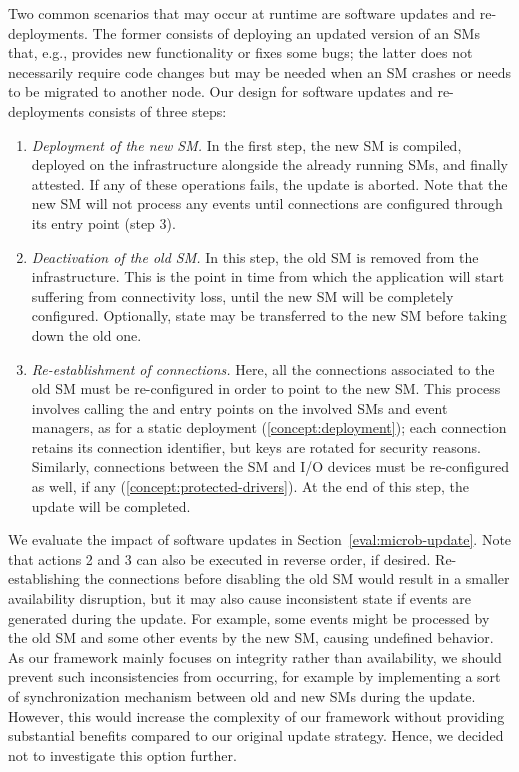 Two common scenarios that may occur at runtime are software updates and
re-deployments. The former consists of deploying an updated version of an
\acp{SM} that, e.g., provides new functionality or fixes some bugs; the latter
does not necessarily require code changes but may be needed when an \ac{SM}
crashes or needs to be migrated to another node. 
%
Our design for software updates and re-deployments consists of three steps:

\begin{enumerate}
  \item \emph{Deployment of the new \ac{SM}.} In the first step, the new \ac{SM}
  is compiled, deployed on the infrastructure alongside the already running
  \acp{SM}, and finally attested. If any of these operations fails, the update
  is aborted. Note that the new \ac{SM} will not process any events until
  connections are configured through its \setkey{} entry point (step 3).
  \item \emph{Deactivation of the old \ac{SM}.} In this step, the old \ac{SM} is
  removed from the infrastructure. This is the point in time from which the
  application will start suffering from connectivity loss, until the new \ac{SM}
  will be completely configured. Optionally, state may be transferred to the new
  \ac{SM} before taking down the old one.
  \item \emph{Re-establishment of connections.} Here, all the connections
  associated to the old \ac{SM} must be re-configured in order to point to the
  new \ac{SM}. This process involves calling the \setkey{} and \addconnection{}
  entry points on the involved \acp{SM} and event managers, as for a static
  deployment (\cref{concept:deployment}); each connection retains its connection
  identifier, but keys are rotated for security reasons. Similarly, connections
  between the \ac{SM} and I/O devices must be re-configured as well, if any
  (\cref{concept:protected-drivers}). At the end of this step, the update will
  be completed.
\end{enumerate}

We evaluate the impact of software updates in Section~\ref{eval:microb-update}.
Note that actions 2 and 3 can also be executed in reverse order, if desired.
Re-establishing the connections before disabling the old \ac{SM} would result in
a smaller availability disruption, but it may also cause inconsistent state if
events are generated during the update. For example, some events might be
processed by the old \ac{SM} and some other events by the new \ac{SM}, causing
undefined behavior. As our framework mainly focuses on integrity rather than
availability, we should prevent such inconsistencies from occurring, for example
by implementing a sort of synchronization mechanism between old and new \acp{SM}
during the update. However, this would increase the complexity of our framework
without providing substantial benefits compared to our original update strategy.
Hence, we decided not to investigate this option further.

